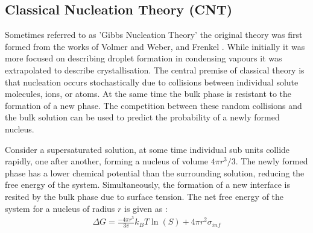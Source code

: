 \subsection{Classical Nucleation Theory (CNT)}
Sometimes referred to as 'Gibbs Nucleation Theory' the 
original theory was first formed from the works of Volmer 
and Weber, and Frenkel \cite{Frenkel1939, Volmer1926}. 
While initially it was more focused on describing droplet
formation in condensing vapours it was extrapolated to 
describe crystallisation. The central premise of classical 
theory is that nucleation occurs stochastically due to 
collisions between individual solute molecules, ions, or 
atoms. At the same time the bulk phase is resistant to the
formation of a new phase. The competition between these 
random collisions and the bulk solution can be used to 
predict the probability of a newly formed nucleus.

Consider a supersaturated solution, at some time individual 
sub units collide rapidly, one after another, forming a 
nucleus of volume $4\pi r^3/3$. The newly formed phase has a 
lower chemical potential than the surrounding solution, 
reducing the free energy of the system. Simultaneously, 
the formation of a new interface is resited by the bulk 
phase due to surface tension. The net free energy of the 
system for a nucleus of radius $r$ is given as \cite{Karthika2016}:
\begin{align}
	\Delta G = \frac{-4\pi r^3}{3v}k_BT\ln(S) + 4\pi r^{2}\sigma_{inf}
	\label{eq:CNT} 
\end{align}

